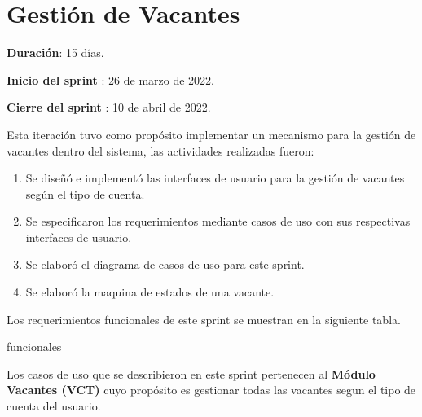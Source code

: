 \clearpage
\section{Gestión de Vacantes}
\begin{description}
    \item \textbf{Duración}: 15 días.
    \item \textbf{Inicio del sprint }: 26 de marzo de 2022.
    \item \textbf{Cierre del sprint }: 10 de abril de 2022.
\end{description}



Esta iteración tuvo como propósito implementar un mecanismo para la gestión de vacantes dentro del sistema, las actividades 
realizadas fueron:
\begin{enumerate}
    \item Se diseñó e implementó las interfaces de usuario para la gestión de vacantes según el tipo de cuenta.
    \item Se especificaron los requerimientos mediante casos de uso con sus respectivas interfaces de usuario.
    \item Se elaboró el diagrama de casos de uso para este sprint.
    \item Se elaboró la maquina de estados de una vacante.
\end{enumerate} 

Los requerimientos funcionales de este sprint se muestran en la siguiente tabla.
\begin{requerimientos}{funcionales}
\end{requerimientos}

Los casos de uso que se describieron en este sprint pertenecen al \textbf{Módulo Vacantes (VCT)} cuyo propósito es gestionar
todas las vacantes segun el tipo de cuenta del usuario.

